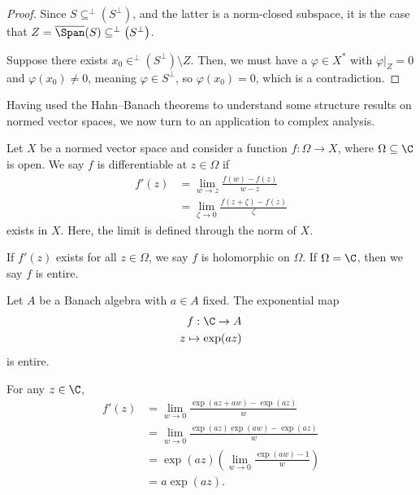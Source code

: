 \documentclass[10pt]{mypackage}
\begin{document}
  \begin{proof}
    Since $S\subseteq ^{\perp}\left(S^{\perp}\right)$, and the latter is a norm-closed subspace, it is the case that $Z = \overline{\Span}(S)\subseteq ^{\perp}\left(S^{\perp}\right)$.\newline

    Suppose there exists $x_0\in ^{\perp}\left(S^{\perp}\right)\setminus Z$. Then, we must have a $\varphi\in X^{\ast}$ with $\varphi|_{Z} = 0$ and $\varphi(x_0)\neq 0$, meaning $\varphi\in S^{\perp}$, so $\varphi\left(x_0\right) = 0$, which is a contradiction.
  \end{proof}
  Having used the Hahn--Banach theorems to understand some structure results on normed vector spaces, we now turn to an application to complex analysis.
  \begin{definition}
    Let $X$ be a normed vector space and consider a function $f: \Omega\rightarrow X$, where $\Omega\subseteq \C$ is open. We say $f$ is differentiable at $z\in \Omega$ if
    \begin{align*}
      f'(z) &= \lim_{w\rightarrow z}\frac{f(w)-f(z)}{w-z}\\
            &= \lim_{\zeta \rightarrow 0}\frac{f(z + \zeta) - f(z)}{\zeta}
    \end{align*}
    exists in $X$. Here, the limit is defined through the norm of $X$.\newline

    If $f'(z)$ exists for all $z\in \Omega$, we say $f$ is holomorphic on $\Omega$. If $\Omega = \C$, then we say $f$ is entire.
  \end{definition}
  \begin{example}
    Let $A$ be a Banach algebra with $a\in A$ fixed. The exponential map
    \begin{align*}
      f: \C\rightarrow A\\
      z\mapsto \exp(az)
    \end{align*}
    is entire.\newline

    For any $z\in \C$,
    \begin{align*}
      f'(z) &= \lim_{w \rightarrow 0}\frac{\exp(az + aw) - \exp(az)}{w}\\
            &= \lim_{w\rightarrow 0}\frac{\exp(az)\exp(aw) - \exp(az)}{w}\\
            &= \exp(az)\left(\lim_{w\rightarrow 0}\frac{\exp(aw)-1}{w}\right)\\
            &= a\exp(az).
    \end{align*}
  \end{example}
\end{document}
